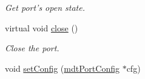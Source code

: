 \begin{DoxyCompactItemize}
\begin{DoxyCompactList}\small\item\em Get port's open state. \end{DoxyCompactList}\item 
virtual void \hyperlink{classmdt_abstract_port_a1ace1a2bd1a04f16952980e247b04800}{close} ()
\begin{DoxyCompactList}\small\item\em Close the port. \end{DoxyCompactList}\item 
\hypertarget{classmdt_abstract_port_a48bdc0a8057c3b119763643098cf798f}{
void \hyperlink{classmdt_abstract_port_a48bdc0a8057c3b119763643098cf798f}{setConfig} (\hyperlink{classmdt_port_config}{mdtPortConfig} $\ast$cfg)}
\label{classmdt_abstract_port_a48bdc0a8057c3b119763643098cf798f}


\end{DoxyCompactItemize}
